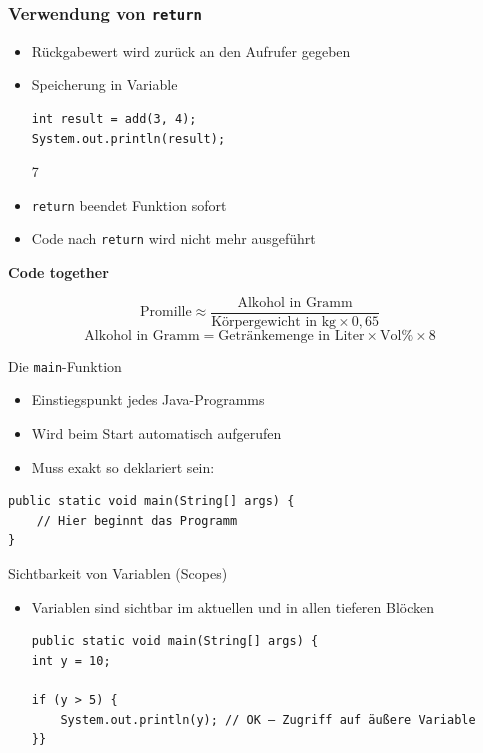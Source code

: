 \documentclass{../../presentation}
\begin{document}
\begin{frame}[fragile]
	\frametitle{Verwendung von \texttt{return}}

	\begin{itemize}
		\item\pause Rückgabewert wird zurück an den Aufrufer gegeben
		\item\pause Speicherung in Variable
		      \begin{verbatim}
int result = add(3, 4);
System.out.println(result); 
		\end{verbatim}
		      \begin{ausgabe}
			      7
		      \end{ausgabe}
		\item\pause \texttt{return} beendet Funktion sofort
		\item\pause Code nach \texttt{return} wird nicht mehr ausgeführt
	\end{itemize}
\end{frame}


\begin{frame}[plain]
	\centering
	{\Huge\bfseries{Code together}}
	\begin{block}{}
		\[
			\text{Promille} \approx \frac{\text{Alkohol in Gramm}}{\text{Körpergewicht in kg} \times 0{,}65}
		\]
		\[
			\text{Alkohol in Gramm} = \text{Getränkemenge in Liter} \times \text{Vol\%} \times 8
		\]
	\end{block}
\end{frame}


\begin{frame}[fragile]{Die \texttt{main}-Funktion}
	\begin{itemize}
		\item\pause Einstiegspunkt jedes Java-Programms
		\item\pause Wird beim Start automatisch aufgerufen
		\item\pause Muss exakt so deklariert sein:
	\end{itemize}

	\vspace{0.5em}

	\begin{verbatim}
public static void main(String[] args) {
    // Hier beginnt das Programm
}
\end{verbatim}
\end{frame}


\begin{frame}[fragile]{Sichtbarkeit von Variablen (Scopes)}
	\begin{itemize}
		\item\pause Variablen sind sichtbar im aktuellen und in allen tieferen Blöcken
		      \begin{verbatim}
public static void main(String[] args) {
int y = 10;

if (y > 5) {
    System.out.println(y); // OK – Zugriff auf äußere Variable
}}
    \end{verbatim}
	\end{itemize}
\end{frame}
\end{document}

